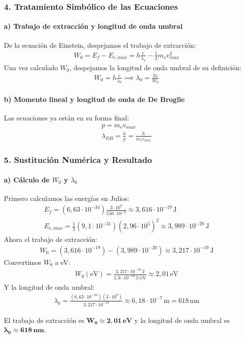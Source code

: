 \subsubsection*{4. Tratamiento Simbólico de las Ecuaciones}
\paragraph*{a) Trabajo de extracción y longitud de onda umbral}
De la ecuación de Einstein, despejamos el trabajo de extracción:
\begin{gather}
    W_0 = E_f - E_{c,max} = h \frac{c}{\lambda_1} - \frac{1}{2} m_e v_{max}^2
\end{gather}
Una vez calculado $W_0$, despejamos la longitud de onda umbral de su definición:
\begin{gather}
    W_0 = h \frac{c}{\lambda_0} \implies \lambda_0 = \frac{h c}{W_0}
\end{gather}
\paragraph*{b) Momento lineal y longitud de onda de De Broglie}
Las ecuaciones ya están en su forma final:
\begin{gather}
    p = m_e v_{max} \\
    \lambda_{DB} = \frac{h}{p} = \frac{h}{m_e v_{max}}
\end{gather}

\subsubsection*{5. Sustitución Numérica y Resultado}
\paragraph*{a) Cálculo de $W_0$ y $\lambda_0$}
Primero calculamos las energías en Julios:
\begin{gather}
    E_f = (6,63\cdot10^{-34}) \frac{3\cdot10^8}{550\cdot10^{-9}} \approx 3,616 \cdot 10^{-19} \, \text{J} \\
    E_{c,max} = \frac{1}{2} (9,1\cdot10^{-31}) (2,96\cdot10^5)^2 \approx 3,989 \cdot 10^{-20} \, \text{J}
\end{gather}
Ahora el trabajo de extracción:
\begin{gather}
    W_0 = (3,616 \cdot 10^{-19}) - (3,989 \cdot 10^{-20}) \approx 3,217 \cdot 10^{-19} \, \text{J}
\end{gather}
Convertimos $W_0$ a eV:
\begin{gather}
    W_0 (\text{eV}) = \frac{3,217 \cdot 10^{-19}\,\text{J}}{1,6 \cdot 10^{-19}\,\text{J/eV}} \approx 2,01 \, \text{eV}
\end{gather}
Y la longitud de onda umbral:
\begin{gather}
    \lambda_0 = \frac{(6,63\cdot10^{-34})(3\cdot10^8)}{3,217\cdot10^{-19}} \approx 6,18 \cdot 10^{-7} \, \text{m} = 618\,\text{nm}
\end{gather}
\begin{cajaresultado}
    El trabajo de extracción es $\boldsymbol{W_0 \approx 2,01 \, \textbf{eV}}$ y la longitud de onda umbral es $\boldsymbol{\lambda_0 \approx 618 \, \textbf{nm}}$.
\end{cajaresultado}
